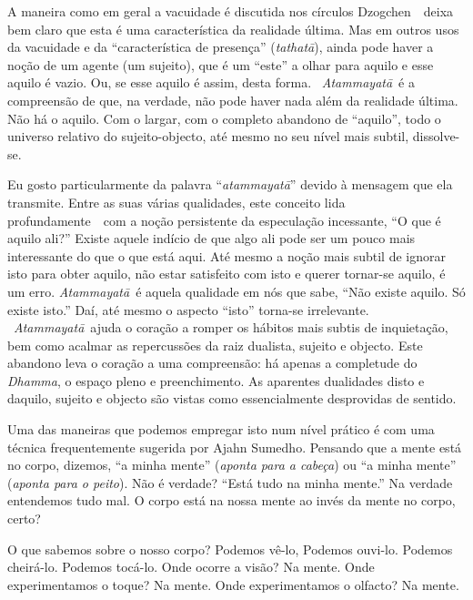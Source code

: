 A maneira como em geral a vacuidade é discutida nos círculos
Dzogchen~~deixa bem claro que esta é uma característica da realidade
última. Mas em outros usos da vacuidade e da ``característica de
presença'' (\emph{tathatā}), ainda pode haver a noção de um agente (um
sujeito), que é um ``este'' a olhar para aquilo e esse aquilo é vazio.
Ou, se esse aquilo é assim, desta forma. ~\emph{Atammayatā}~é a
compreensão de que, na verdade, não pode haver nada além da realidade
última. Não há o aquilo. Com o largar, com o completo abandono de
``aquilo'', todo o universo relativo do sujeito-objecto, até mesmo no
seu nível mais subtil, dissolve-se.

Eu gosto particularmente da palavra ``\emph{atammayatā}'' devido à
mensagem que ela transmite. Entre as suas várias qualidades, este
conceito lida profundamente~~com a noção persistente da especulação
incessante, ``O que é aquilo ali?'' Existe aquele indício de que algo
ali pode ser um pouco mais interessante do que o que está aqui. Até
mesmo a noção mais subtil de ignorar isto para obter aquilo, não estar
satisfeito com isto e querer tornar-se aquilo, é um erro.
\emph{Atammayatā}~é aquela qualidade em nós que sabe, ``Não existe
aquilo. Só existe isto.'' Daí, até mesmo o aspecto ``isto'' torna-se
irrelevante. ~\emph{Atammayatā}~ajuda o coração a romper os hábitos mais
subtis de inquietação, bem como acalmar as repercussões da raiz
dualista, sujeito e objecto. Este abandono leva o coração a uma
compreensão: há apenas a completude do \emph{Dhamma}, o espaço pleno e
preenchimento. As aparentes dualidades disto e daquilo, sujeito e
objecto são vistas como essencialmente desprovidas de sentido.

Uma das maneiras que podemos empregar isto num nível prático é com uma
técnica frequentemente sugerida por Ajahn Sumedho. Pensando que a mente
está no corpo, dizemos, ``a minha mente'' (\emph{aponta para a cabeça})
ou ``a minha mente'' (\emph{aponta para o peito}). Não é verdade? ``Está
tudo na minha mente.'' Na verdade entendemos tudo mal. O corpo está na
nossa mente ao invés da mente no corpo, certo?

O que sabemos sobre o nosso corpo? Podemos vê-lo, Podemos ouvi-lo.
Podemos cheirá-lo. Podemos tocá-lo. Onde ocorre a visão? Na mente. Onde
experimentamos o toque? Na mente. Onde experimentamos o olfacto? Na
mente.

